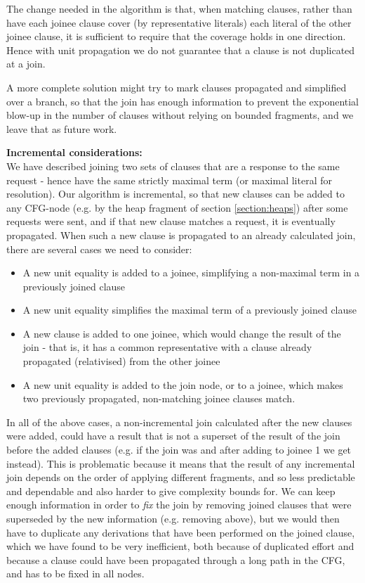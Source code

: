 The change needed in the algorithm is that, when matching clauses, rather than have each joinee clause cover (by representative literals) 
each literal of the other joinee clause, it is sufficient to require that the coverage holds in one direction. Hence with unit propagation we do not guarantee that a clause is not duplicated at a join.

A more complete solution might try to mark clauses propagated and simplified over a branch, 
so that the join has enough information to prevent the exponential blow-up in the number of clauses without relying on bounded fragments, and we leave that as future work.

\noindent
\textbf{Incremental considerations:}\\
We have described joining two sets of clauses that are a response to the same request - hence have the same strictly maximal term (or maximal literal for resolution).
Our algorithm is incremental, so that new clauses can be added to any CFG-node (e.g. by the heap fragment of section \ref{section:heaps}) after some requests were sent, and if that new clause matches a request, it is eventually propagated. 
When such a new clause is propagated to an already calculated join, there are several cases we need to consider:

\begin{itemize}
	\item A new unit equality is added to a joinee, simplifying a non-maximal term in a previously joined clause
	\item A new unit equality simplifies the maximal term of a previously joined clause
	\item A new clause is added to one joinee, which would change the result of the join - that is, it has a common representative with a clause already propagated (relativised) from the other joinee
	\item A new unit equality is added to the join node, or to a joinee, which makes two previously propagated, non-matching joinee clauses match.
\end{itemize}
In all of the above cases, a non-incremental join calculated after the new clauses were added, could have a result that is not a superset of the result of the join before the added clauses (e.g. if the join was 
and after adding  to joinee 1 we get  instead).
This is problematic because it means that the result of any incremental join depends on the order of applying different fragments, and so less predictable and dependable and also harder to give complexity bounds for.
We can keep enough information in order to \emph{fix} the join by removing joined clauses that were superseded by the new information 
(e.g. removing  above), but we would then have to duplicate any derivations that have been performed on the joined clause, which we have found to be very inefficient, both because of duplicated effort and because a clause could have been propagated through a long path in the CFG, and has to be fixed in all nodes.


